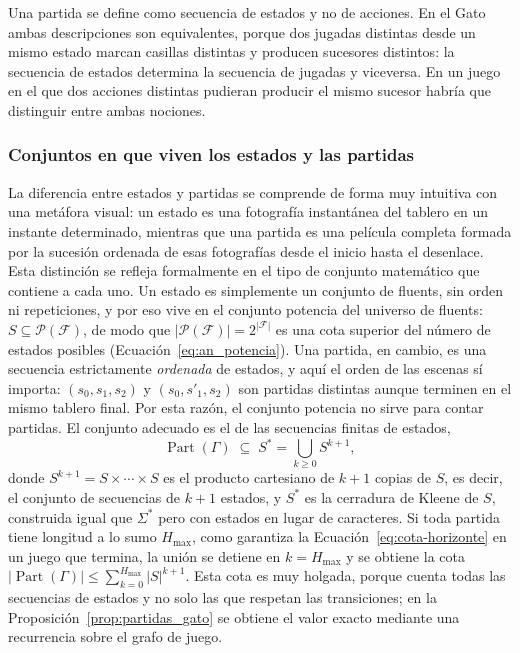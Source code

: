 Una partida se define como secuencia de estados y no de acciones. En el Gato ambas descripciones son equivalentes, porque dos jugadas distintas desde un mismo estado marcan casillas distintas y producen sucesores distintos: la secuencia de estados determina la secuencia de jugadas y viceversa. En un juego en el que dos acciones distintas pudieran producir el mismo sucesor habría que distinguir entre ambas nociones.

\subsubsection{Conjuntos en que viven los estados y las partidas}

La diferencia entre estados y partidas se comprende de forma muy intuitiva con una metáfora visual: un estado es una fotografía instantánea del tablero en un instante determinado, mientras que una partida es una película completa formada por la sucesión ordenada de esas fotografías desde el inicio hasta el desenlace. Esta distinción se refleja formalmente en el tipo de conjunto matemático que contiene a cada uno. Un estado es simplemente un conjunto de fluents, sin orden ni repeticiones, y por eso vive en el conjunto potencia del universo de fluents: $S \subseteq \mathcal P(\mathcal F)$, de modo que $|\mathcal P(\mathcal F)| = 2^{|\mathcal F|}$ es una cota superior del número de estados posibles (Ecuación~\eqref{eq:an_potencia}). Una partida, en cambio, es una secuencia estrictamente \emph{ordenada} de estados, y aquí el orden de las escenas sí importa: $(s_0, s_1, s_2)$ y $(s_0, s'_1, s_2)$ son partidas distintas aunque terminen en el mismo tablero final. Por esta razón, el conjunto potencia no sirve para contar partidas. El conjunto adecuado es el de las secuencias finitas de estados,
\begin{equation}
    \operatorname{Part}(\Gamma) \;\subseteq\; S^* = \bigcup_{k \ge 0} S^{k+1},
    \label{eq:an_part_secuencias}
\end{equation}
donde $S^{k+1} = S \times \cdots \times S$ es el producto cartesiano de $k+1$ copias de $S$, es decir, el conjunto de secuencias de $k+1$ estados, y $S^*$ es la cerradura de Kleene de $S$, construida igual que $\Sigma^*$ pero con estados en lugar de caracteres. Si toda partida tiene longitud a lo sumo $H_{\max}$, como garantiza la Ecuación~\eqref{eq:cota-horizonte} en un juego que termina, la unión se detiene en $k = H_{\max}$ y se obtiene la cota $|\operatorname{Part}(\Gamma)| \le \sum_{k=0}^{H_{\max}} |S|^{k+1}$. Esta cota es muy holgada, porque cuenta todas las secuencias de estados y no solo las que respetan las transiciones; en la Proposición~\ref{prop:partidas_gato} se obtiene el valor exacto mediante una recurrencia sobre el grafo de juego.

